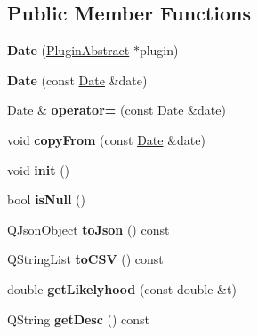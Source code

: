 \subsection*{Public Member Functions}
\begin{DoxyCompactItemize}
\item 
\hypertarget{class_date_ab5e0ee4405e06760897f216b952caeae}{{\bfseries Date} (\hyperlink{class_plugin_abstract}{Plugin\-Abstract} $\ast$plugin)}\label{class_date_ab5e0ee4405e06760897f216b952caeae}

\item 
\hypertarget{class_date_ad60a06bab3db402303ea74ebc409ce29}{{\bfseries Date} (const \hyperlink{class_date}{Date} \&date)}\label{class_date_ad60a06bab3db402303ea74ebc409ce29}

\item 
\hypertarget{class_date_acd5d4962b5eab0ec1bbd382235081383}{\hyperlink{class_date}{Date} \& {\bfseries operator=} (const \hyperlink{class_date}{Date} \&date)}\label{class_date_acd5d4962b5eab0ec1bbd382235081383}

\item 
\hypertarget{class_date_aca413423db6d18f5e76f9105f71d4755}{void {\bfseries copy\-From} (const \hyperlink{class_date}{Date} \&date)}\label{class_date_aca413423db6d18f5e76f9105f71d4755}

\item 
\hypertarget{class_date_aecb83a4e00acd5f65567a6f1d6f95554}{void {\bfseries init} ()}\label{class_date_aecb83a4e00acd5f65567a6f1d6f95554}

\item 
\hypertarget{class_date_a0357b3d538405eb205c64855823a36e2}{bool {\bfseries is\-Null} ()}\label{class_date_a0357b3d538405eb205c64855823a36e2}

\item 
\hypertarget{class_date_a9dcf4c73e980fc952fcad7f79872ba3e}{Q\-Json\-Object {\bfseries to\-Json} () const }\label{class_date_a9dcf4c73e980fc952fcad7f79872ba3e}

\item 
\hypertarget{class_date_a35bbffcba9dc614beb4a59f8a5cf684e}{Q\-String\-List {\bfseries to\-C\-S\-V} () const }\label{class_date_a35bbffcba9dc614beb4a59f8a5cf684e}

\item 
\hypertarget{class_date_ae81f9744ecd8881e2395455987e5e542}{double {\bfseries get\-Likelyhood} (const double \&t)}\label{class_date_ae81f9744ecd8881e2395455987e5e542}

\item 
\hypertarget{class_date_a7759183581c7f41d14f39f41a347f1d1}{Q\-String {\bfseries get\-Desc} () const }\label{class_date_a7759183581c7f41d14f39f41a347f1d1}


\end{DoxyCompactItemize}
